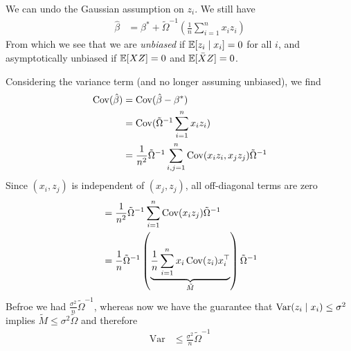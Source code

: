 We can undo the Gaussian assumption on $z_i$. We still have
\begin{align}
  \hat{\beta}
    &= \beta^* + \tilde{\Omega}^{-1} \left(
      \frac{1}{n}  \sum_{i=1}^n x_i z_i
    \right)
\end{align} 
From which we see that we are \emph{unbiased} if $\mathbb{E}[z_i \mid x_i]
= 0$ for all $i$, and asymptotically unbiased if $\mathbb{E}[X Z] = 0$ and
$\mathbb{E}[\bar{X} Z] = 0$.

Considering the variance term (and no longer assuming unbiased), we find
\begin{align}
  \operatorname{Cov}(\hat{\beta})
  &= \operatorname{Cov}(\hat{\beta} - \beta^*) \\
  &= \operatorname{Cov}(\tilde{\Omega}^{-1} \sum_{i=1}^n x_i z_i) \\
  &= \frac{1}{n^2} \tilde{\Omega}^{-1} \sum_{i,j=1}^n \operatorname{Cov}(x_i z_i, x_j z_j) \tilde{\Omega}^{-1}
\end{align}
Since $(x_i, z_j)$ is independent of $(x_j, z_j)$, all off-diagonal
terms are zero
\begin{align}
  &= \frac{1}{n^2} \tilde{\Omega}^{-1} \sum_{i=1}^n \operatorname{Cov}(x_i z_j) \tilde{\Omega}^{-1} \\
  &= \frac{1}{n} \tilde{\Omega}^{-1} \left(\underbrace{
      \frac{1}{n}  \sum_{i=1}^n x_i \operatorname{Cov}(z_i) x_i^\top
    }_{\tilde{M}}
  \right) \tilde{\Omega}^{-1}
\end{align}
Befroe we had $\frac{\sigma^2}{n} \tilde{\Omega}^{-1}$, whereas
now we have the guarantee that $\operatorname{Var}(z_i \mid x_i) \leq \sigma^2$
implies $\tilde{M} \leq \sigma^2 \tilde{\Omega}$
and therefore
\begin{align}
  \text{Var} &\leq \frac{\sigma^2}{n} \tilde{\Omega}^{-1}
\end{align}

